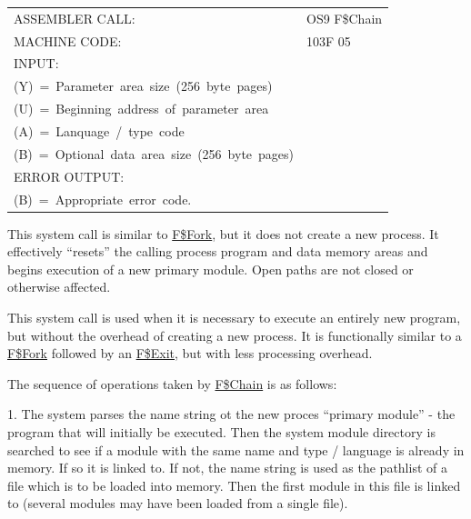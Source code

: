 \documentclass[
]{article}
\newcounter{none} %
\begin{document}
{\def\LTcaptype{none} %
\begin{longtable}[]{@{}
  >{\raggedright\arraybackslash}p{}
  >{\raggedright\arraybackslash}p{}@{}}
\toprule\noalign{}
\endhead
\bottomrule\noalign{}
\endlastfoot
ASSEMBLER CALL: & OS9 F\$Chain \\
MACHINE CODE: & 103F 05 \\
INPUT: & \begin{minipage}[t]{\linewidth}\raggedright
(X)~=~Address~of~module~name~or~file~name\\
(Y)~=~Parameter~area~size~(256~byte~pages)\\
(U)~=~Beginning~address~of~parameter~area\\
(A)~=~Lanquage~/~type~code\\
(B)~=~Optional~data~area~size~(256~byte~pages)
\end{minipage} \\
ERROR OUTPUT: & \begin{minipage}[t]{\linewidth}\raggedright
(CC)~=~C~bit~set.\\
(B)~=~Appropriate~error~code.
\end{minipage} \\
\end{longtable}
}

This system call is similar to \hyperref[f.fork]{F\$Fork}, but it does
not create a new process. It effectively ``resets'' the calling
process\textquotesingle{} program and data memory areas and begins
execution of a new primary module. Open paths are not closed or
otherwise affected.

This system call is used when it is necessary to execute an entirely new
program, but without the overhead of creating a new process. It is
functionally similar to a \hyperref[f.fork]{F\$Fork} followed by an
\hyperref[f.exit]{F\$Exit}, but with less processing overhead.

The sequence of operations taken by \hyperref[f.chain]{F\$Chain} is as
follows:

1. The system parses the name string ot the new proces\textquotesingle{}
``primary module'' - the program that will initially be executed. Then
the system module directory is searched to see if a module with the same
name and type / language is already in memory. If so it is linked to. If
not, the name string is used as the pathlist of a file which is to be
loaded into memory. Then the first module in this file is linked to
(several modules may have been loaded from a single file).
\end{document}
